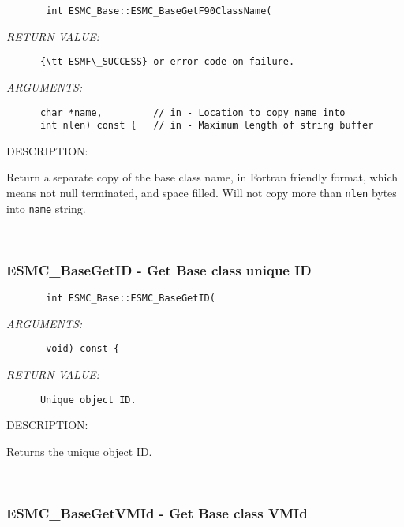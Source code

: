   
\begin{verbatim}       int ESMC_Base::ESMC_BaseGetF90ClassName(\end{verbatim}{\em RETURN VALUE:}
\begin{verbatim}      {\tt ESMF\_SUCCESS} or error code on failure.\end{verbatim}{\em ARGUMENTS:}
\begin{verbatim}      char *name,         // in - Location to copy name into
      int nlen) const {   // in - Maximum length of string buffer\end{verbatim}
{\sf DESCRIPTION:\\ }


       Return a separate copy of the base class name, in Fortran friendly
       format, which means not null terminated, and space filled.
       Will not copy more than {\tt nlen} bytes into {\tt name} string.
   
 
\mbox{}\hrulefill\
 
\subsubsection [ESMC\_BaseGetID] {ESMC\_BaseGetID - Get Base class unique ID}


  
\begin{verbatim}       int ESMC_Base::ESMC_BaseGetID(\end{verbatim}{\em ARGUMENTS:}
\begin{verbatim}       void) const {\end{verbatim}{\em RETURN VALUE:}
\begin{verbatim}      Unique object ID.\end{verbatim}
{\sf DESCRIPTION:\\ }


      Returns the unique object ID.
   
 
\mbox{}\hrulefill\
 
\subsubsection [ESMC\_BaseGetVMId] {ESMC\_BaseGetVMId - Get Base class VMId}


